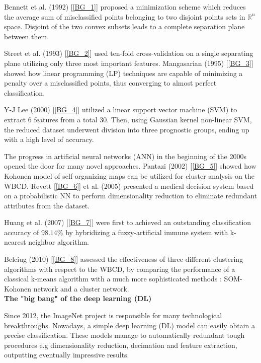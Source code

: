 \documentclass[12pt]{article}
\numberwithin{equation}{section}
\begin{document}
\begin{flushleft}
Bennett et al. (1992) [\ref{BG_1}] proposed a minimization scheme which reduces the average sum of misclassified points belonging to two disjoint points sets in $\mathbb{R}^{n}$ space. Disjoint of the two convex subsets leads to a complete separation plane between them. 

Street et al. (1993) [\ref{BG_2}] used ten-fold cross-validation on a single separating plane utilizing only three most important features. Mangasarian (1995) [\ref{BG_3}] showed how linear programming (LP) techniques are capable of minimizing a penalty over a misclassified points, thus converging to almost perfect classification.

Y-J Lee (2000) [\ref{BG_4}] utilized a linear support vector machine (SVM) to extract 6 features from a total 30. Then, using Gaussian kernel non-linear SVM, the reduced dataset underwent division into three prognostic groups, ending up with a high level of accuracy.

The progress in artificial neural networks (ANN) in the beginning of the 2000s opened the door for many novel approaches. Pantazi (2002) [\ref{BG_5}] showed how Kohonen model of self-organizing maps can be utilized for cluster analysis on the WBCD. Revett [\ref{BG_6}] et al. (2005) presented a medical decision system based on a probabilistic NN to perform dimensionality reduction to eliminate redundant attributes from the dataset. 

Huang et al. (2007) [\ref{BG_7}] were first to achieved an outstanding classification accuracy of $98.14 \%$ by hybridizing a fuzzy-artificial immune system with k-nearest neighbor algorithm. 

Belciug (2010) [\ref{BG_8}] assessed the effectiveness of three different clustering algorithms with respect to the WBCD, by comparing the performance of a classical k-means algorithm with a much more sophisticated methods : SOM-Kohonen network and a cluster network. \\[0.6cm]

\textbf{The "big bang" of the deep learning (DL)}

Since 2012, the ImageNet project is responsible for many technological breakthroughs. Nowadays, a simple deep learning (DL) model can easily obtain a precise classification. These models manage to automatically redundant tough procedures e.g dimensionality reduction, decimation and feature extraction, outputting eventually impressive results.


\end{flushleft}
\end{document}
